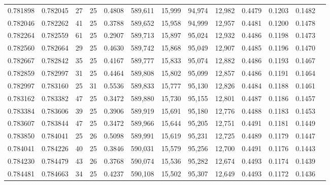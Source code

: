\begin{tabular}{rrrrrrrrrrrrr}
0.781898 & 0.782045 &    27 &  25 &                                     0.4808 & 589,611 &  15,999 &  94,974 &  12,982 & 0.4479 & 0.1203 & 0.1482 \\
0.782046 & 0.782262 &    41 &  25 &                                     0.3788 & 589,652 &  15,958 &  94,999 &  12,957 & 0.4481 & 0.1200 & 0.1478 \\
0.782264 & 0.782559 &    61 &  25 &                                     0.2907 & 589,713 &  15,897 &  95,024 &  12,932 & 0.4486 & 0.1198 & 0.1473 \\
0.782560 & 0.782664 &    29 &  25 &                                     0.4630 & 589,742 &  15,868 &  95,049 &  12,907 & 0.4485 & 0.1196 & 0.1470 \\
0.782667 & 0.782842 &    35 &  25 &                                     0.4167 & 589,777 &  15,833 &  95,074 &  12,882 & 0.4486 & 0.1193 & 0.1467 \\
0.782859 & 0.782997 &    31 &  25 &                                     0.4464 & 589,808 &  15,802 &  95,099 &  12,857 & 0.4486 & 0.1191 & 0.1464 \\
0.782997 & 0.783160 &    25 &  31 &                                     0.5536 & 589,833 &  15,777 &  95,130 &  12,826 & 0.4484 & 0.1188 & 0.1461 \\
0.783162 & 0.783382 &    47 &  25 &                                     0.3472 & 589,880 &  15,730 &  95,155 &  12,801 & 0.4487 & 0.1186 & 0.1457 \\
0.783384 & 0.783606 &    39 &  25 &                                     0.3906 & 589,919 &  15,691 &  95,180 &  12,776 & 0.4488 & 0.1183 & 0.1453 \\
0.783607 & 0.783844 &    47 &  25 &                                     0.3472 & 589,966 &  15,644 &  95,205 &  12,751 & 0.4491 & 0.1181 & 0.1449 \\
0.783850 & 0.784041 &    25 &  26 &                                     0.5098 & 589,991 &  15,619 &  95,231 &  12,725 & 0.4489 & 0.1179 & 0.1447 \\
0.784041 & 0.784226 &    40 &  25 &                                     0.3846 & 590,031 &  15,579 &  95,256 &  12,700 & 0.4491 & 0.1176 & 0.1443 \\
0.784230 & 0.784479 &    43 &  26 &                                     0.3768 & 590,074 &  15,536 &  95,282 &  12,674 & 0.4493 & 0.1174 & 0.1439 \\
0.784481 & 0.784663 &    34 &  25 &                                     0.4237 & 590,108 &  15,502 &  95,307 &  12,649 & 0.4493 & 0.1172 & 0.1436 \\

\end{tabular}

